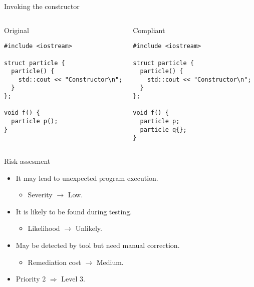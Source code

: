 \begin{frame}[t,fragile]{Invoking the constructor}
\begin{columns}

\begin{block}{Original}
\begin{lstlisting}
#include <iostream>

struct particle {
  particle() {
    std::cout << "Constructor\n";
  }
};

void f() {
  particle p();
}
\end{lstlisting}
\end{block}

\pause
{}
\begin{block}{Compliant}
\begin{lstlisting}[escapechar=@]
#include <iostream>

struct particle {
  particle() {
    std::cout << "Constructor\n";
  }
};

void f() {
  particle p;
  particle q{};
}
\end{lstlisting}
\end{block}

\end{columns}
\end{frame}

\begin{frame}[t]{Risk assesment}
\begin{itemize}
  \item It may lead to unexpected program execution.
    \begin{itemize}
      \item Severity $\rightarrow$ Low.
    \end{itemize}

  \vfill
  \item It is likely to be found during testing.
    \begin{itemize}
      \item Likelihood $\rightarrow$ Unlikely.
    \end{itemize}

  \vfill
  \item May be detected by tool but need manual correction.
    \begin{itemize}
      \item Remediation cost $\rightarrow$ Medium.
    \end{itemize}

  \vfill
  \item Priority 2 $\Rightarrow$ Level 3.
\end{itemize}
\end{frame}
